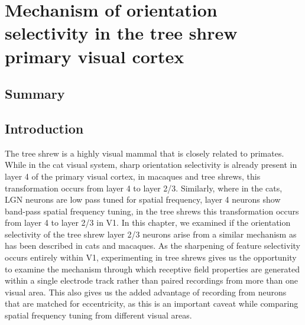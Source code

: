 
\chapter{Mechanism of orientation selectivity in the tree shrew primary visual cortex}


\section{Summary}


\section{Introduction}

The tree shrew is a highly visual mammal that is closely related to
primates. While in the cat visual system, sharp orientation selectivity
is already present in layer 4 of the primary visual cortex, in macaques
and tree shrews, this transformation occurs from layer 4 to layer 2/3.
Similarly, where in the cats, LGN neurons are low pass tuned for spatial
frequency, layer 4 neurons show band-pass spatial frequency tuning, in
the tree shrews this transformation occurs from layer 4 to layer 2/3 in
V1. In this chapter, we examined if the orientation selectivity of the
tree shrew layer 2/3 neurons arise from a similar mechanism as has been
described in cats and macaques. As the sharpening of feature selectivity
occurs entirely within V1, experimenting in tree shrews gives us the
opportunity to examine the mechanism through which receptive field
properties are generated within a single electrode track rather than
paired recordings from more than one visual area. This also gives us the
added advantage of recording from neurons that are matched for
eccentricity, as this is an important caveat while comparing spatial
frequency tuning from different visual areas.

